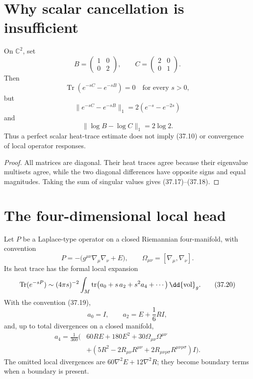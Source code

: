 \documentclass[11pt]{article}
\theoremstyle{remark}
\begin{document}
\section{Why scalar cancellation is insufficient}

\begin{countertheorem}
\label{cth:v15v37-trace-cancellation}
On \(\mathbb C^2\), set
\[
 B=\begin{pmatrix}1&0\\0&2\end{pmatrix},\qquad
 C=\begin{pmatrix}2&0\\0&1\end{pmatrix}.                 \tag{37.15}
\]
Then
\[
 \operatorname{Tr}(e^{-sC}-e^{-sB})=0
 \quad\text{for every }s>0,                              \tag{37.16}
\]
but
\[
 \|e^{-sC}-e^{-sB}\|_1=2(e^{-s}-e^{-2s})                 \tag{37.17}
\]
and
\[
 \|\log B-\log C\|_1=2\log2.                             \tag{37.18}
\]
Thus a perfect scalar heat-trace estimate does not imply (37.10)
or convergence of local operator responses.
\end{countertheorem}

\begin{proof}
All matrices are diagonal.  Their heat traces agree because their
eigenvalue multisets agree, while the two diagonal differences have
opposite signs and equal magnitudes.  Taking the sum of singular
values gives (37.17)--(37.18).
\end{proof}

\section{The four-dimensional local head}

Let \(P\) be a Laplace-type operator on a closed Riemannian
four-manifold, with convention
\[
 P=-\bigl(g^{\mu\nu}\nabla_\mu\nabla_\nu+E\bigr),\qquad
 \Omega_{\mu\nu}=[\nabla_\mu,\nabla_\nu].                \tag{37.19}
\]
Its heat trace has the formal local expansion
\[
 \operatorname{Tr}(e^{-sP})
 \sim(4\pi s)^{-2}
 \int_M\operatorname{tr}
 \bigl(a_0+s\,a_2+s^2a_4+\cdots\bigr)\,\dd{\rm vol}_g.
                                                               \tag{37.20}
\]
With the convention (37.19),
\[
 a_0=I,\qquad a_2=E+\frac16RI,                            \tag{37.21}
\]
and, up to total divergences on a closed manifold,
\[
 \begin{split}
 a_4=\frac1{360}\bigl(&60RE+180E^2+30\Omega_{\mu\nu}\Omega^{\mu\nu}\\
 &+(5R^2-2R_{\mu\nu}R^{\mu\nu}
       +2R_{\mu\nu\rho\sigma}R^{\mu\nu\rho\sigma})I
 \bigr).                                                 \tag{37.22}
 \end{split}
\]
The omitted local divergences are \(60\nabla^2E+12\nabla^2R\);
they become boundary terms when a boundary is present.
\end{document}
